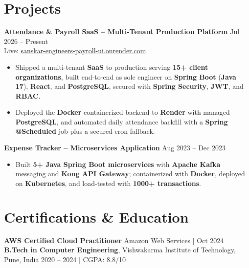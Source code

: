 \documentclass[a4paper,10pt]{article}
\begin{document}
\section*{Projects}

\textbf{Attendance \& Payroll SaaS -- Multi-Tenant Production Platform} \hfill Jul 2026 -- Present \\
Live: \href{https://sanskar-engineers-payroll-ui.onrender.com/login}{sanskar-engineers-payroll-ui.onrender.com}
\begin{itemize}[leftmargin=*]
    \item Shipped a multi-tenant \textbf{SaaS} to production serving \textbf{15+ client organizations}, built end-to-end as sole engineer on \textbf{Spring Boot} (\textbf{Java 17}), \textbf{React}, and \textbf{PostgreSQL}, secured with \textbf{Spring Security}, \textbf{JWT}, and \textbf{RBAC}.
    \item Deployed the \textbf{Docker}-containerized backend to \textbf{Render} with managed \textbf{PostgreSQL}, and automated daily attendance backfill with a \textbf{Spring @Scheduled} job plus a secured cron fallback.
\end{itemize}

\textbf{Expense Tracker -- Microservices Application} \hfill Aug 2023 -- Dec 2023
\begin{itemize}[leftmargin=*]
    \item Built \textbf{5+ Java Spring Boot microservices} with \textbf{Apache Kafka} messaging and \textbf{Kong API Gateway}; containerized with \textbf{Docker}, deployed on \textbf{Kubernetes}, and load-tested with \textbf{1000+ transactions}.
\end{itemize}

\section*{Certifications \& Education}
\textbf{AWS Certified Cloud Practitioner} \hfill Amazon Web Services \;|\; Oct 2024 \\
\textbf{B.Tech in Computer Engineering}, Vishwakarma Institute of Technology, Pune, India \hfill 2020 -- 2024 \;|\; CGPA: 8.8/10
\end{document}
